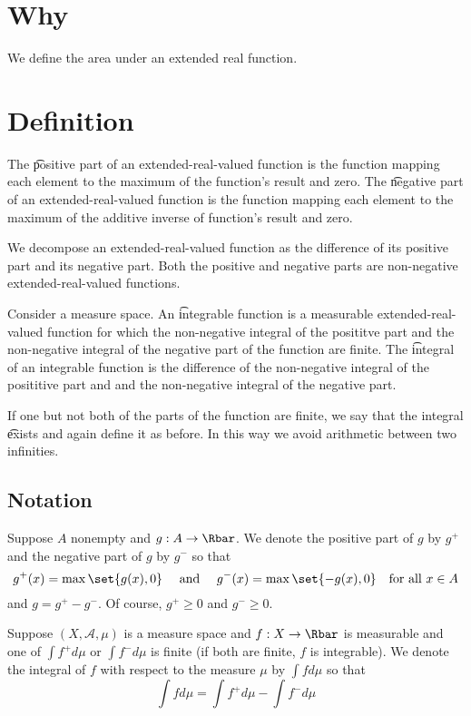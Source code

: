 
\section*{Why}

We define the area under an extended real function.

\section*{Definition}

The \t{positive part} of an extended-real-valued function is the function mapping each element to the maximum of the function's result and zero.
The \t{negative part} of an extended-real-valued function is the function mapping each element to the maximum of the additive inverse of function's result and zero.

We decompose an extended-real-valued function as the difference of its positive part and its negative part.
Both the positive and negative parts are non-negative extended-real-valued functions.

Consider a measure space.
An \t{integrable} function is a measurable extended-real-valued function for which the non-negative integral of the posititve part and the non-negative integral of the negative part of the function are finite.
The \t{integral} of an integrable function is the difference of the non-negative integral of the posititive part and and the non-negative integral of the negative part.

If one but not both of the parts of the function are finite, we say that the integral \t{exists} and again define it as before.
In this way we avoid arithmetic between two infinities.

\subsection*{Notation}

Suppose $A$ nonempty and $g: A \to \Rbar$.
We denote the positive part of $g$ by $g^+$ and the negative part of $g$ by $g^-$ so that
\[
g^+(x) = \max\set{g(x), 0}
\quad \text{ and } \quad
g^-(x) = \max\set{-g(x), 0} \quad \text{for all } x \in A
\]
and $g = g^+ - g^-$.
Of course, $g^+ \geq 0$ and $g^- \geq 0$.

Suppose $(X, \mathcal{A} , \mu )$ is a measure space and $f: X \to \Rbar$ is measurable and one of $\int  f^+ d \mu $ or $\int  f^- d \mu $ is finite (if both are finite, $f$ is integrable).
We denote the integral of $f$ with respect to the measure $\mu $ by $\int  f d\mu $ so that
\[
\int  f d\mu  = \int  f^+ d\mu  - \int  f^- d\mu
\]
